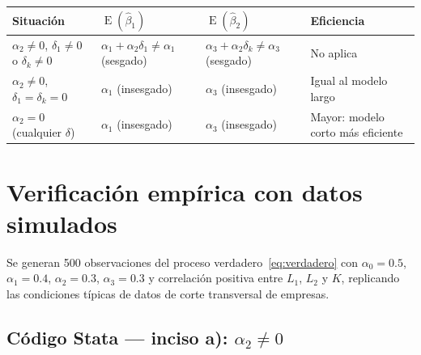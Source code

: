 \documentclass[12pt, letterpaper]{article}
\newcommand{\E}{\operatorname{E}}
\begin{document}
\begin{center}
\renewcommand{\arraystretch}{1.4}
\small
\begin{tabular}{p{5.0cm}p{3.2cm}p{3.2cm}p{3.2cm}}
\toprule
\textbf{Situación} & \textbf{$\E(\hat{\beta}_1)$} & \textbf{$\E(\hat{\beta}_2)$} & \textbf{Eficiencia} \\
\midrule
$\alpha_2 \neq 0$, $\delta_1 \neq 0$ o $\delta_k \neq 0$
  & $\alpha_1 + \alpha_2\delta_1 \neq \alpha_1$ \newline (sesgado)
  & $\alpha_3 + \alpha_2\delta_k \neq \alpha_3$ \newline (sesgado)
  & No aplica \\[6pt]
$\alpha_2 \neq 0$, $\delta_1 = \delta_k = 0$
  & $\alpha_1$ (insesgado)
  & $\alpha_3$ (insesgado)
  & Igual al modelo largo \\[6pt]
$\alpha_2 = 0$ (cualquier $\delta$)
  & $\alpha_1$ (insesgado)
  & $\alpha_3$ (insesgado)
  & Mayor: modelo corto más eficiente \\
\bottomrule
\end{tabular}
\end{center}

\section{Verificación empírica con datos simulados}

Se generan 500 observaciones del proceso verdadero~\eqref{eq:verdadero} con
$\alpha_0 = 0.5$, $\alpha_1 = 0.4$, $\alpha_2 = 0.3$, $\alpha_3 = 0.3$ y
correlación positiva entre $L_1$, $L_2$ y $K$, replicando las condiciones
típicas de datos de corte transversal de empresas.

\subsection{Código Stata --- inciso a): $\alpha_2 \neq 0$}
\end{document}
